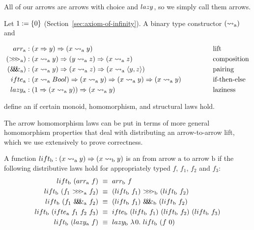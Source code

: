 All of our arrows are arrows with choice and $lazy$, so we simply call them arrows.

\begin{definition}[arrow]Let $1 := \{{0}\}$ (Section~\ref{sec:axiom-of-infinity}). A binary type constructor $(\rightsquigarrow_\mathrm{a})$ and
\begin{displaybreaks}
\begin{equation}
\begin{aligned}
	arr_\mathrm{a} &: (x \Rightarrow y) \Rightarrow (x \rightsquigarrow_\mathrm{a} y)
	&&\text{lift}
\\*
	({>}\mspace{-6mu}{>}\mspace{-6mu}{>}_\mathrm{a}) &: (x \rightsquigarrow_\mathrm{a} y) \Rightarrow (y \rightsquigarrow_\mathrm{a} z) \Rightarrow (x \rightsquigarrow_\mathrm{a} z)
	&&\text{composition}
\\
	(\mathit{\&\mspace{-7.5mu}\&\mspace{-7.5mu}\&}_\mathrm{a}) &: (x \rightsquigarrow_\mathrm{a} y) \Rightarrow (x \rightsquigarrow_\mathrm{a} z) \Rightarrow (x \rightsquigarrow_\mathrm{a} \langle{y,z}\rangle)
	&&\text{pairing}
\\
	ifte_\mathrm{a} &: (x \rightsquigarrow_\mathrm{a} Bool) \Rightarrow (x \rightsquigarrow_\mathrm{a} y) \Rightarrow (x \rightsquigarrow_\mathrm{a} y) \Rightarrow (x \rightsquigarrow_\mathrm{a} y)
	\hspace{0.5in}&&\text{if-then-else}
\\*
	lazy_\mathrm{a} &: (1 \Rightarrow (x \rightsquigarrow_\mathrm{a} y)) \Rightarrow (x \rightsquigarrow_\mathrm{a} y)
	&&\text{laziness}
\label{eqn:arrow-combinators}
\end{aligned}
\end{equation}
\end{displaybreaks}
define an  if certain monoid, homomorphism, and structural laws hold.
\end{definition}

The arrow homomorphism laws can be put in terms of more general homomorphism properties that deal with distributing an arrow-to-arrow lift, which we use extensively to prove correctness.

\begin{definition}
\label{def:arrow-homomorphism}
A function $lift_\mathrm{b} : (x \rightsquigarrow_\mathrm{a} y) \Rightarrow (x \rightsquigarrow_\mathrm{b} y)$ is an  from arrow $\mathrm{a}$ to arrow $\mathrm{b}$ if the following distributive laws hold for appropriately typed $f$, $f_1$, $f_2$ and $f_3$:
\begin{align}
	lift\genb~(\arrowarr\gen~f) &\ \equiv \ \arrowarr\genb~f
	\label{eqn:lift-distributes-over-arr}
\\
	lift\genb~(f_1~\arrowcomp\gen~f_2) &\ \equiv \ (lift\genb~f_1)~\arrowcomp\genb~(lift\genb~f_2)
	\label{eqn:lift-distributes-over-comp}
\\
	lift\genb~(f_1~\arrowpair\gen~f_2) &\ \equiv \ (lift\genb~f_1)~\arrowpair\genb~(lift\genb~f_2)
	\label{eqn:lift-distributes-over-pair}
\\
	\arrowlift\genb~(\arrowif\gen~f_1~f_2~f_3) &\ \equiv \ 
		\arrowif\genb~(lift\genb~f_1)~(lift\genb~f_2)~(lift\genb~f_3)
	\label{eqn:lift-distributes-over-if}
\\
	\arrowlift\genb~(\arrowlazy\gen~f) &\ \equiv \
		\arrowlazy\genb~\fun{0}{\arrowlift\genb~(f~0)}
	\label{eqn:lift-distributes-over-lazy}
\end{align}
\end{definition}

